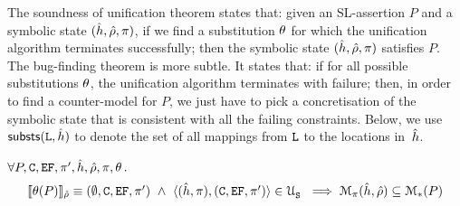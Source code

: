The soundness of unification theorem states that: given an SL-assertion $P$ and a 
symbolic state $(\hat{h}, \hat\rho, \pi)$, if we find a substitution $\theta$ 
for which the unification algorithm terminates successfully; then the symbolic state
$(\hat{h}, \hat\rho, \pi)$ satisfies $P$. 
The bug-finding theorem is more subtle. It states that: if for all possible substitutions 
$\theta$, the unification algorithm terminates with failure; then, in order to find a counter-model 
for $P$, we just have to pick a concretisation of the symbolic state that is consistent with all 
the failing constraints. Below, we use ${\sf substs}(\mathtt{L}, \hat{h})$ to denote 
the set of all mappings from $\mathtt{L}$ to the locations in~$\hat{h}$. 

\begin{theorem}\label{teo:unification:soundness}
$\forall P, \mathtt{C}, \mathtt{EF}, \pi',  \hat{h}, \hat\rho, \pi, \theta \, .$
$$
\begin{array}{l}
\symbeval{\subst(P)}{\sstore} \equiv (\emptyset, \cells, \efs, \pfs') \ \wedge \ \unificationfull{\sheap, \pc}{\cells, \efs, \pfs'}{} \
    \implies \smodels{\sheap, \sstore}{\pc} \subseteq \sepmodels{P}   
\end{array}
$$ 
\end{theorem}

%




